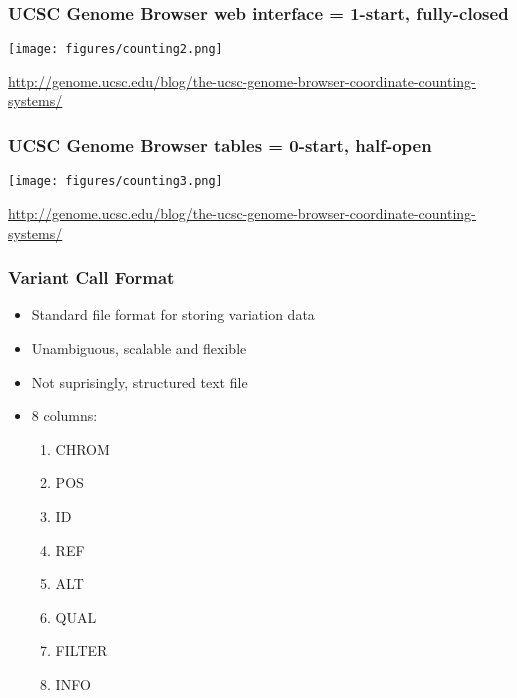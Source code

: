 \documentclass{beamer}
\begin{document}
\begin{frame}
  \frametitle{UCSC Genome Browser web interface = 1-start, fully-closed}

    \centering   
    \texttt{[image: figures/counting2.png]}

 {\tiny \url{http://genome.ucsc.edu/blog/the-ucsc-genome-browser-coordinate-counting-systems/}}

\end{frame}

\begin{frame}
  \frametitle{UCSC Genome Browser tables = 0-start, half-open}

    \centering   
    \texttt{[image: figures/counting3.png]}

 {\tiny \url{http://genome.ucsc.edu/blog/the-ucsc-genome-browser-coordinate-counting-systems/}}

\end{frame}





\begin{frame}
  \frametitle{Variant Call Format}
  \begin{itemize}
  \item Standard file format for storing variation data
  \item  Unambiguous, scalable and flexible
  \item Not suprisingly, structured text file
  \item 8 columns: 


    
    \begin{enumerate}
    \item  CHROM
     \item  POS
    \item   ID
    \item   REF
     \item  ALT
     \item  QUAL
     \item  FILTER
     \item  INFO
    \end{enumerate}


  \end{itemize}
\end{frame}
\end{document}
